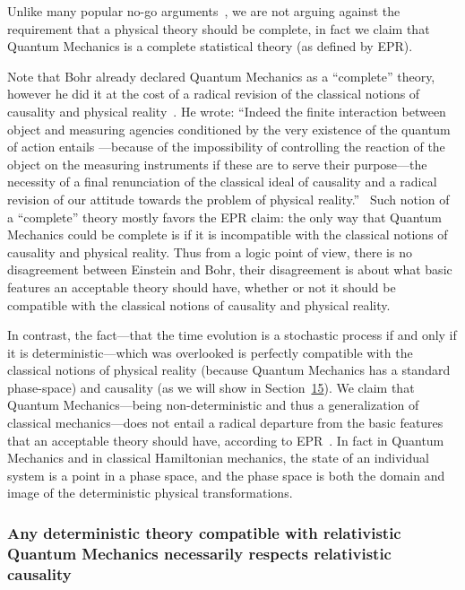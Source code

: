 \documentclass[11pt]{book}
\begin{document}
Unlike many popular no-go
arguments~\cite{Laudisa2014Against},
we are not arguing against the requirement that a physical theory should
be complete, in fact we claim that Quantum Mechanics is a complete
statistical theory (as defined by EPR).

Note that Bohr already declared Quantum Mechanics as a ``complete''
theory, however he did it at the cost of a radical revision of the
classical notions of causality and physical
reality~\cite{Bohr1935Can}. He wrote:
``Indeed the finite interaction between object and measuring agencies
conditioned by the very existence of the quantum of action entails
---because of the impossibility of controlling the reaction of the
object on the measuring instruments if these are to serve their
purpose---the necessity of a final renunciation of the classical ideal
of causality and a radical revision of our attitude towards the problem
of physical reality.''~\cite{Bohr1935Can}
Such notion of a ``complete'' theory mostly favors the EPR claim: the
only way that Quantum Mechanics could be complete is if it is
incompatible with the classical notions of causality and physical
reality. Thus from a logic point of view, there is no disagreement
between Einstein and Bohr, their disagreement is about what basic
features an acceptable theory should have, whether or not it should be
compatible with the classical notions of causality and physical reality.

In contrast, the fact---that the time evolution is a stochastic process
if and only if it is deterministic---which was overlooked is perfectly
compatible with the classical notions of physical reality (because
Quantum Mechanics has a standard phase-space) and causality (as we will
show in Section~\protect\hyperlink{sec:relativistictheory}{15}). We
claim that Quantum Mechanics---being non-deterministic and thus a
generalization of classical mechanics---does not entail a radical
departure from the basic features that an acceptable theory should have,
according to EPR~\cite{Einstein1935Can}. In fact in Quantum Mechanics and in classical Hamiltonian
mechanics, the state of an individual system is a point in a phase
space, and the phase space is both the domain and image of the
deterministic physical transformations.

\hypertarget{any-deterministic-theory-compatible-with-relativistic-quantum-mechanics-necessarily-respects-relativistic-causality}{%
\subsubsection{Any deterministic theory compatible with relativistic
Quantum Mechanics necessarily respects relativistic
causality}\label{any-deterministic-theory-compatible-with-relativistic-quantum-mechanics-necessarily-respects-relativistic-causality}}
\end{document}
